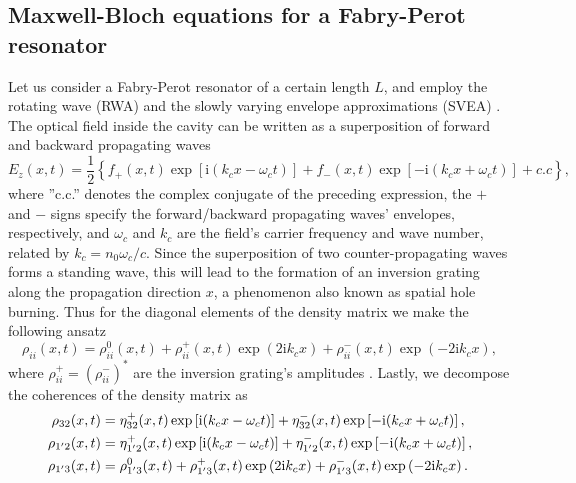 \documentclass[10pt]{article}
\begin{document}
			\subsection{Maxwell-Bloch equations for a Fabry-Perot resonator}
			\label{sec:MBFP}
			Let us consider a Fabry-Perot resonator of a
			certain length $L$, and employ the rotating wave (RWA) and the slowly varying
			envelope approximations (SVEA) \cite{boyd2003nonlinear,gordon2008multimode}.
			The optical field inside the cavity can be written as a superposition of
			forward and backward propagating waves
			\begin{equation}
				E_{z}(x,t)=\frac{1}{2}\left\{  f_{+}(x,t)\exp\left [  \mathrm{i}(k_{c}%
				x-\omega_{c}t)\right ]  +f_{-}(x,t)\exp\left [ -\mathrm{i}(k_{c}x+\omega
				_{c}t)\right ]  +c.c\right\}  , \label{eq:e-ansatz}%
			\end{equation}
			where ''c.c.'' denotes the complex conjugate of the preceding expression, the
			$+$ and $-$ signs specify the forward/backward propagating waves' envelopes,
			respectively, and $\omega_{c}$ and $k_{c}$ are the field's carrier frequency
			and wave number, related by $k_{c}=n_{0}\omega_{c}/c$. Since the superposition
			of two counter-propagating waves forms a standing wave, this will lead to the
			formation of an inversion grating along the propagation direction $x$, a
			phenomenon also known as spatial hole burning. Thus for the diagonal elements
			of the density matrix we make the following ansatz
			\begin{equation}
				\rho_{ii}(x,t)=\rho_{ii}^{0}(x,t)+\rho_{ii}^{+}(x,t)\exp\left(  2\mathrm{i}%
				k_{c}x\right)  +\rho_{ii}^{-}(x,t)\exp\left(  -2\mathrm{i}k_{c}x\right)  ,
				\label{eq:ii-ansatz}%
			\end{equation}
			where $\rho_{ii}^{+}=(\rho_{ii}^{-})^{\ast}$ are the inversion grating's
			amplitudes \cite{wang2007coherent}. Lastly, we decompose the coherences of the
			density matrix as 
			\begin{subequations}
				\centering
				\label{eq:cohansatz}%
				\begin{align}
					\rho_{32}(x,t)  &  =\eta_{32}^{+}(x,t)\exp\left[  \mathrm{i}(k_{c}x-\omega
					_{c}t)\right]  +\eta_{32}^{-}(x,t)\exp\left[  -\mathrm{i}(k_{c}x+\omega
					_{c}t)\right]  ,\label{eq:32ansatz}\\
					\rho_{1^{\prime}2}(x,t)  &  =\eta_{1^{\prime}2}^{+}(x,t)\exp\left[
					\mathrm{i}(k_{c}x-\omega_{c}t)\right]  +\eta_{1^{\prime}2}^{-}(x,t)\exp\left[
					-\mathrm{i}(k_{c}x+\omega_{c}t)\right]  ,\label{eq:12ansatz}\\
					\rho_{1^{\prime}3}(x,t)  &  =\rho_{1^{\prime}3}^{0}(x,t)+\rho_{1^{\prime}%
						3}^{+}(x,t)\exp\left(  2\mathrm{i}k_{c}x\right)  +\rho_{1^{\prime}3}%
					^{-}(x,t)\exp\left(  -2\mathrm{i}k_{c}x\right)  . \label{eq:13ansatz}%
				\end{align}
			\end{subequations}
\end{document}

